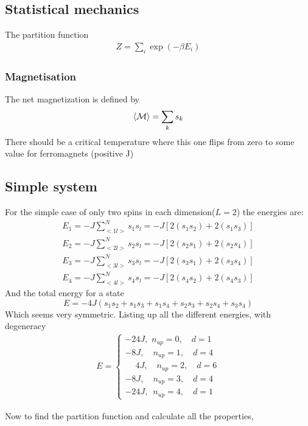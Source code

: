 \documentclass[11pt,a4paper,english]{article}
\numberwithin{equation}{section}
\newcommand{\magM}{\mathcal{M}}
\begin{document}
\subsection{Statistical mechanics}
The partition function
\begin{gather}
Z = \sum_i \exp(-\beta E_i)
\end{gather}

\subsubsection{Magnetisation}

The net magnetization is defined by
\begin{gather}
\expval{\magM} = \sum_k s_k
\end{gather}
There should be a critical temperature where this one flips from 
zero to some value for ferromagnets (positive J)


\subsection{Simple system}
For the simple case of only two spins in each dimension($L=2$) the energies are:
\begin{align*}
E_1 = -J\sum_{<1l>}^{N}s_1 s_l = -J[2(s_1 s_2)+2(s_1 s_3)] \\
E_2 = -J\sum_{<2l>}^{N}s_2 s_l = -J[2(s_2 s_1)+2(s_2 s_4)] \\
E_3 = -J\sum_{<3l>}^{N}s_3 s_l = -J[2(s_3 s_1)+2(s_3 s_4)] \\
E_4 = -J\sum_{<4l>}^{N}s_4 s_l = -J[2(s_4 s_2)+2(s_4 s_3)] 
\end{align*}
And the total energy for a state 
\begin{equation}
E = -4J(s_1s_2 + s_1s_3 + s_1s_4 + s_2s_3 + s_2s_4 + s_3s_4)
\end{equation}
Which seems very symmetric. Listing up all the different energies,
with degeneracy
\begin{gather*}
 E = 
\begin{cases}
-24J,\,\,n_{up} = 0,\quad d = 1\\
-8J,\quad n_{up} = 1,\quad d = 4\\
\phantom{-}4J, \quad n_{up} = 2, \quad d = 6\\
-8J,\quad n_{up} = 3, \quad d= 4\\
-24J,\,\,\,n_{up} = 4, \quad d = 1
\end{cases}
\end{gather*}

Now to find the partition function and calculate all the properties,
\end{document}
